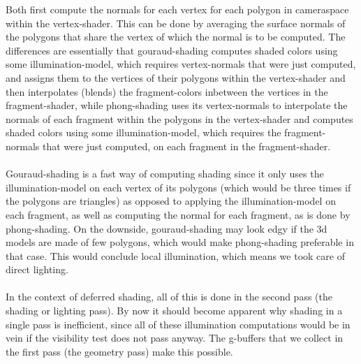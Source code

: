 \documentclass{ACGSeminar}
\begin{document}
		Both first compute the normals for each vertex for each polygon in cameraspace within the vertex-shader. This can be done by averaging the surface normals of the polygons that share the vertex of which the normal is to be computed. The differences are essentially that gouraud-shading computes shaded colors using some illumination-model, which requires vertex-normals that were just computed, and assigns them to the vertices of their polygons within the vertex-shader and then interpolates (blends) the fragment-colors inbetween the vertices in the fragment-shader, while phong-shading uses its vertex-normals to interpolate the normals of each fragment within the polygons in the vertex-shader and computes shaded colors using some illumination-model, which requires the fragment-normals that were just computed, on each fragment in the fragment-shader. \\\\
		Gouraud-shading is a fast way of computing shading since it only uses the illumination-model on each vertex of its polygons (which would be three times if the polygons are triangles) as opposed to applying the illumination-model on each fragment, as well as computing the normal for each fragment, as is done by phong-shading. On the downside, gouraud-shading may look edgy if the 3d models are made of few polygons, which would make phong-shading preferable in that case. This would conclude local illumination, which means we took care of direct lighting. \\\\
		In the context of deferred shading, all of this is done in the second pass (the shading or lighting pass). By now it should become apparent why shading in a single pass is inefficient, since all of these illumination computations would be in vein if the visibility test does not pass anyway. The g-buffers that we collect in the first pass (the geometry pass) make this possible. 
\end{document}
